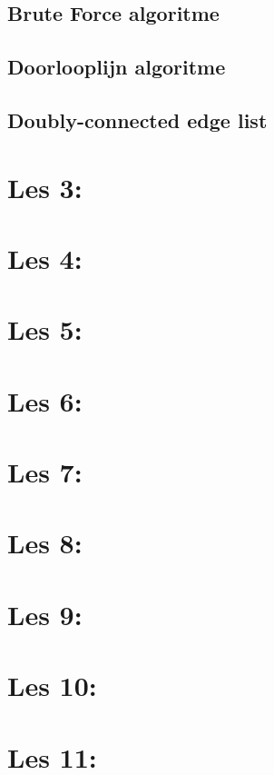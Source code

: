\documentclass[12pt,a4paper]{article}
\begin{document}
	\subsection{Brute Force algoritme}
	\subsection{Doorlooplijn algoritme}
	\subsection{Doubly-connected edge 	list}
	\section{Les 3: }
	\section{Les 4: }
	\section{Les 5: }
	\section{Les 6: }
	\section{Les 7: }
	\section{Les 8: }
	\section{Les 9: }
	\section{Les 10: }
	\section{Les 11: }
\end{document}
